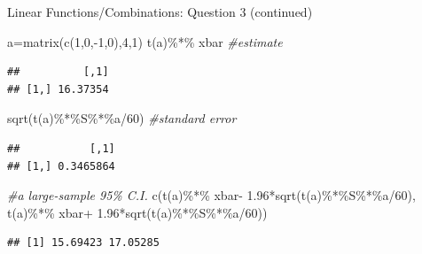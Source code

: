 \documentclass[
  ignorenonframetext,
]{beamer}
\newenvironment{Shaded}{\begin{snugshade}}{\end{snugshade}}
\newcommand{\CommentTok}[1]{\textcolor[rgb]{0.56,0.35,0.01}{\textit{#1}}}
\newcommand{\DecValTok}[1]{\textcolor[rgb]{0.00,0.00,0.81}{#1}}
\newcommand{\FloatTok}[1]{\textcolor[rgb]{0.00,0.00,0.81}{#1}}
\newcommand{\FunctionTok}[1]{\textcolor[rgb]{0.00,0.00,0.00}{#1}}
\newcommand{\NormalTok}[1]{#1}
\newcommand{\OtherTok}[1]{\textcolor[rgb]{0.56,0.35,0.01}{#1}}
\newcommand{\SpecialCharTok}[1]{\textcolor[rgb]{0.00,0.00,0.00}{#1}}
\begin{document}
\begin{frame}[fragile]{Linear Functions/Combinations: Question 3
(continued)}
\protect\hypertarget{linear-functionscombinations-question-3-continued}{}
\begin{Shaded}
\begin{Highlighting}[]
\NormalTok{a}\OtherTok{=}\FunctionTok{matrix}\NormalTok{(}\FunctionTok{c}\NormalTok{(}\DecValTok{1}\NormalTok{,}\DecValTok{0}\NormalTok{,}\SpecialCharTok{{-}}\DecValTok{1}\NormalTok{,}\DecValTok{0}\NormalTok{),}\DecValTok{4}\NormalTok{,}\DecValTok{1}\NormalTok{)}
\FunctionTok{t}\NormalTok{(a)}\SpecialCharTok{\%*\%}\NormalTok{ xbar }\CommentTok{\#estimate }
\end{Highlighting}
\end{Shaded}

\begin{verbatim}
##          [,1]
## [1,] 16.37354
\end{verbatim}

\begin{Shaded}
\begin{Highlighting}[]
\FunctionTok{sqrt}\NormalTok{(}\FunctionTok{t}\NormalTok{(a)}\SpecialCharTok{\%*\%}\NormalTok{S}\SpecialCharTok{\%*\%}\NormalTok{a}\SpecialCharTok{/}\DecValTok{60}\NormalTok{) }\CommentTok{\#standard error}
\end{Highlighting}
\end{Shaded}

\begin{verbatim}
##           [,1]
## [1,] 0.3465864
\end{verbatim}

\begin{Shaded}
\begin{Highlighting}[]
\CommentTok{\#a large{-}sample 95\% C.I. }
\FunctionTok{c}\NormalTok{(}\FunctionTok{t}\NormalTok{(a)}\SpecialCharTok{\%*\%}\NormalTok{ xbar}\SpecialCharTok{{-}} \FloatTok{1.96}\SpecialCharTok{*}\FunctionTok{sqrt}\NormalTok{(}\FunctionTok{t}\NormalTok{(a)}\SpecialCharTok{\%*\%}\NormalTok{S}\SpecialCharTok{\%*\%}\NormalTok{a}\SpecialCharTok{/}\DecValTok{60}\NormalTok{), }
  \FunctionTok{t}\NormalTok{(a)}\SpecialCharTok{\%*\%}\NormalTok{ xbar}\SpecialCharTok{+} \FloatTok{1.96}\SpecialCharTok{*}\FunctionTok{sqrt}\NormalTok{(}\FunctionTok{t}\NormalTok{(a)}\SpecialCharTok{\%*\%}\NormalTok{S}\SpecialCharTok{\%*\%}\NormalTok{a}\SpecialCharTok{/}\DecValTok{60}\NormalTok{))}
\end{Highlighting}
\end{Shaded}

\begin{verbatim}
## [1] 15.69423 17.05285
\end{verbatim}
\end{frame}
\end{document}
